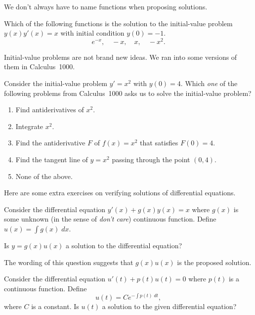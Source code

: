 \documentclass[../main.tex]{subfiles}
\begin{document}
We don't always have to name functions when proposing solutions.
\begin{example}
  Which of the following functions is the solution to the initial-value problem \(y(x)y'(x) = x\) with initial condition \(y(0) = -1\).
  \[
    e^{-x}, \quad -x, \quad x, \quad -x^{2}.
  \]
\end{example}

Initial-value problems are not brand new ideas. We ran into some versions of them in Calculus~1000.
\begin{example}
  Consider the initial-value problem \(y' = x^{2}\) with \(y(0) = 4\).  Which \emph{one} of the following problems from Calculus~1000 asks us to solve the initial-value problem?

  \begin{enumerate}[label=(\alph*)]
    \item Find antiderivatives of \(x^{2}\).
    \item Integrate \(x^{2}\).
    \item Find the antiderivative \(F\) of \(f(x) = x^{2}\) that satisfies \(F(0) = 4\).
    \item Find the tangent line of \(y = x^{2}\) passing through the point \((0,4)\).
    \item None of the above.
  \end{enumerate}
\end{example}
\clearpage

Here are some extra exercises on verifying solutions of differential equations.

\begin{example}
  Consider the differential equation \(y'(x) + g(x) y(x) = x\) where \(g(x)\) is some unknown (in the sense of \emph{don't care}) continuous function. Define \(u(x) = \int g(x) \;dx\). 

  Is \(y = g(x)u(x)\) a solution to the differential equation? 

  The wording of this question suggests that \(g(x) u(x)\) is the proposed solution. 
\end{example}
\clearpage


\begin{example}
  Consider the differential equation \( u'(t) + p(t) u(t) = 0\) where \(p(t)\) is a continuous function. Define
  \[
    u(t) = C e^{-\int p(t) \;dt},
  \]
  where \(C\) is a constant. Is \(u(t)\) a solution to the given differential equation?
\end{example}
\end{document}
